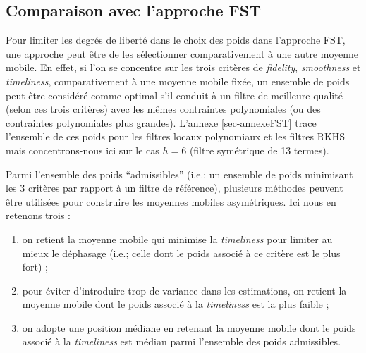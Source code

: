\documentclass[
  11pt,
  french,
  a4paper]{article}
\newcommand\1{\mathds{1}}
\begin{document}
\hypertarget{comparaison-avec-lapproche-fst}{%
\subsection{Comparaison avec l'approche FST}\label{comparaison-avec-lapproche-fst}}

Pour limiter les degrés de liberté dans le choix des poids dans l'approche FST, une approche peut être de les sélectionner comparativement à une autre moyenne mobile.
En effet, si l'on se concentre sur les trois critères de \emph{fidelity}, \emph{smoothness} et \emph{timeliness}, comparativement à une moyenne mobile fixée, un ensemble de poids peut être considéré comme optimal s'il conduit à un filtre de meilleure qualité (selon ces trois critères) avec les mêmes contraintes polynomiales (ou des contraintes polynomiales plus grandes).
L'annexe \ref{sec-annexeFST} trace l'ensemble de ces poids pour les filtres locaux polynomiaux et les filtres RKHS mais concentrons-nous ici sur le cas \(h=6\) (filtre symétrique de 13 termes).

Parmi l'ensemble des poids ``admissibles'' (i.e.; un ensemble de poids minimisant les 3 critères par rapport à un filtre de référence), plusieurs méthodes peuvent être utilisées pour construire les moyennes mobiles asymétriques.
Ici nous en retenons trois :

\begin{enumerate}
\def\labelenumi{\arabic{enumi}.}
\item
  on retient la moyenne mobile qui minimise la \emph{timeliness} pour limiter au mieux le déphasage (i.e.; celle dont le poids associé à ce critère est le plus fort) ;
\item
  pour éviter d'introduire trop de variance dans les estimations, on retient la moyenne mobile dont le poids associé à la \emph{timeliness} est la plus faible ;
\item
  on adopte une position médiane en retenant la moyenne mobile dont le poids associé à la \emph{timeliness} est médian parmi l'ensemble des poids admissibles.
\end{enumerate}
\end{document}
